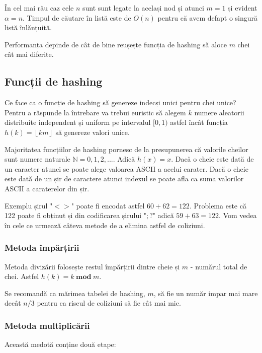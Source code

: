 În cel mai rău caz cele $n$ sunt sunt legate la același nod și atunci $m=1$ și evident  $\alpha=n$. Timpul de căutare în listă este de $O(n)$ pentru că avem defapt o singură listă înlănțuită.

Performanța depinde de cât de bine reușește funcția de hashing să aloce $m$ chei cât mai diferite.

\subsection{Funcții de hashing}

Ce face ca o funcție de hashing să genereze indecși unici pentru chei unice? Pentru a răspunde la întrebare va trebui euristic să alegem $k$ numere aleatorii distribuite independent și uniform pe intervalul $[0,1)$ astfel încât funcția $h(k)=\left \lfloor km \right \rfloor$ să genereze valori unice.

Majoritatea funcțiilor de hashing pornesc de la presupunerea că valorile cheilor sunt numere naturale $\mathbb{N}={0,1,2,...}$. Adică $h(x)=x$. Dacă o cheie este dată de un caracter atunci se poate alege valoarea ASCII a acelui carater. Dacă o cheie este dată de un șir de caractere atunci indexul se poate afla ca suma valorilor ASCII a caraterelor din șir.

Exemplu șirul "$<>$" poate fi encodat astfel $60+62=122$. Problema este că 122 poate fi obținut și din codificarea șirului "$;?$" adică $59+63=122$. Vom vedea în cele ce urmează câteva metode de a elimina astfel de coliziuni.

\subsubsection{Metoda împărțirii}

Metoda divizării folosește restul împărțirii dintre cheie și $m$ - numărul total de chei. Astfel $h(k)=k \hspace{3pt} \textbf{mod} \hspace{3pt} m$.

Se recomandă ca mărimea tabelei de hashing, $m$, să fie un număr impar mai mare decât $n/3$ pentru ca riscul de coliziuni să fie cât mai mic.


\subsubsection{Metoda multiplicării}

Această medotă conține două etape:

